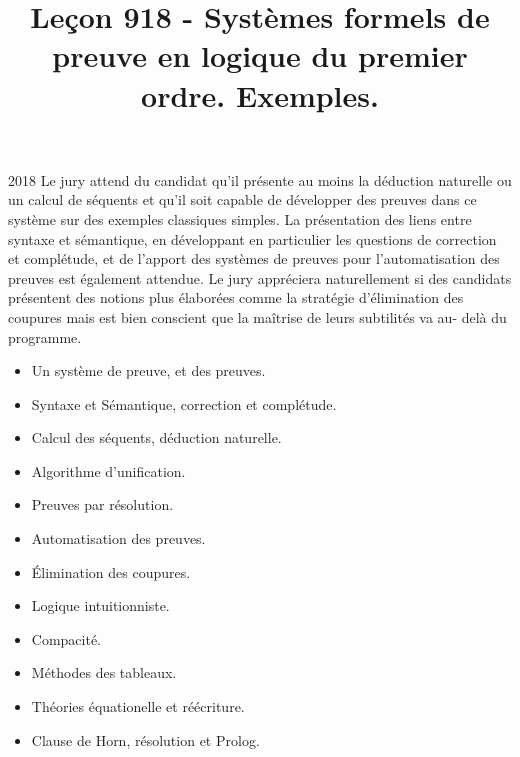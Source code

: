 \documentclass{agregfiche}
\title{Leçon 918 - Systèmes formels de preuve en logique du premier ordre. Exemples.}
\begin{document}
\maketitle

\secrapports
\begin{rapport}{2018}
	Le jury attend du candidat qu’il présente au moins la déduction naturelle ou un calcul de séquents
	et qu’il soit capable de développer des preuves dans ce système sur des exemples classiques simples.
	La présentation des liens entre syntaxe et sémantique, en développant en particulier les questions de
	correction et complétude, et de l’apport des systèmes de preuves pour l’automatisation des preuves est
	également attendue.
	Le jury appréciera naturellement si des candidats présentent des notions plus élaborées comme la
	stratégie d’élimination des coupures mais est bien conscient que la maîtrise de leurs subtilités va au-
	delà du programme.
\end{rapport}

\secindispensables

\begin{itemize}
	\item Un système de preuve, et des preuves.
	\item Syntaxe et Sémantique, correction et complétude.
\end{itemize}

\secasavoir

\begin{itemize}
	\item Calcul des séquents, déduction naturelle.
	\item Algorithme d'unification.
	\item Preuves par résolution.
	\item Automatisation des preuves.
\end{itemize}

\secidees

\begin{itemize}
	\item Élimination des coupures.
	\item Logique intuitionniste.
	\item Compacité.
	\item Méthodes des tableaux.
	\item Théories équationelle et réécriture.
	\item Clause de Horn, résolution et Prolog.
\end{itemize}

\secpieges
\end{document}
